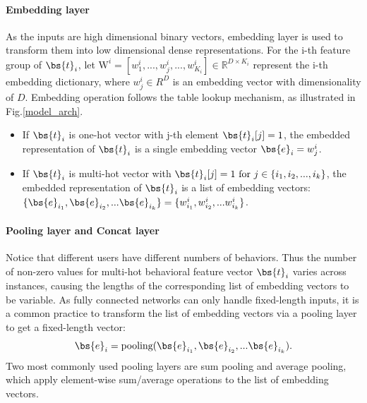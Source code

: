 \paragraph{\textbf{Embedding layer}} As the inputs are high dimensional binary vectors, embedding layer is used to transform them into low dimensional dense representations. 
For the i-th feature group of $\bs{t}_i$,  let $\mathrm{W}^i = [w_1^i,...,w_j^i, ..., w_{K_i}^i] \in\mathbb{R}^{D \times K_i}$ represent the i-th embedding dictionary, where $w_j^i \in R^D$ is an embedding vector with dimensionality of $D$.  
Embedding operation follows the table lookup mechanism, as illustrated in Fig.\ref{model_arch}. 
\begin{itemize}
\item If $\bs{t}_i$ is one-hot vector with j-th element $\bs{t}_i[j]=1$, the embedded representation of $\bs{t}_i$ is a single embedding vector $\bs{e}_i = w_j^i$. 
\item If $\bs{t}_i$ is multi-hot vector with $\bs{t}_i[j]=1 ~\text{for}~ j \in \{i_1, i_2, ..., i_k\} $, the embedded representation of $\bs{t}_i$ is a list of embedding vectors: $\{\bs{e}_{i_1}, \bs{e}_{i_2},...\bs{e}_{i_k}\} = \{w_{i_1}^i, w_{i_2}^i, ...w_{i_k}^i\}$.
\end{itemize}



\paragraph{\textbf{Pooling layer and Concat layer}} 
Notice that different users have different numbers of behaviors. Thus the number of non-zero values for multi-hot behavioral feature vector $\bs{t}_i$  varies across instances, causing the lengths of the corresponding list of embedding vectors to be variable.
As fully connected networks can only handle fixed-length inputs, it is a common practice \cite{widedeep,youtube:recommend} to transform the list of embedding vectors via a pooling layer to get a fixed-length vector: 
\begin{equation}
\label{eq:pooling}
\bs{e}_i = \text{pooling}(\bs{e}_{i_1}, \bs{e}_{i_2},...\bs{e}_{i_k}).	
\end{equation}
Two most commonly used pooling layers are sum pooling and average pooling, which apply element-wise sum/average operations to the list of embedding vectors. 

